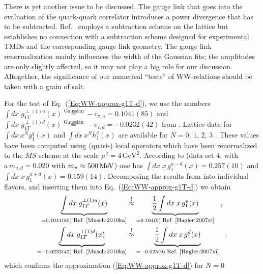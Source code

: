 \documentclass[a4paper,11pt]{article}
\newcommand{\ba}{\begin{eqnarray}}
\newcommand{\ea}{\end{eqnarray}}
\begin{document}
There is yet another issue to be discussed. 
The gauge link that goes into the evaluation of the quark-quark correlator 
introduces a power divergence that has to be subtracted. 
Ref.~\cite{Musch:2010ka} employs a subtraction scheme on the lattice
but establishes no connection with a subtraction scheme designed for 
experimental TMDs and the corresponding gauge link geometry. 
The gauge link renormalization mainly 
influences the width of the Gaussian fits; the amplitudes are only slightly 
affected, so it may not play a big role for our discussion. Altogether, the 
significance of our numerical ``tests'' of WW-relations should be taken 
with a grain of salt.

For the test of Eq.~(\ref{Eq:WW-approx-g1T-d}), we use the numbers 
$\int d x\;g_{1T}^{\perp(1)u}(x)\stackrel{\text{Gaussian}}{=}-c_{7,u}= 0.1041(85)$ 
and
$\int d x\;g_{1T}^{\perp(1)d}(x)\stackrel{\text{Gaussian}}{=}-c_{7,d}=-0.0232(42)$
from \cite{Musch:2010ka}. %
Lattice data for
$\int d x \,x^{N}g_1^q(x)$
\cite{Hagler:2003is,Hagler:2007xi} and
$\int d x \,x^{N}h_1^q(x)$
\cite{Gockeler:2005cj} are available for $N=0,\,1,\,2,\,3$ .
These values have been computed using (quasi-) local operators which 
have been renormalized to the $\overline{MS}$ scheme at the scale 
$\mu^2 = 4\,\text{GeV}^2$.
According to \cite{Hagler:2007xi} (data set 4:
with $a\,m_{u,d} = 0.020$ with $m_\pi\approx 500\,{\rm MeV}$)
one has $\int d x \;x\,g_1^{u-d}(x)= 0.257(10)$ and
$\int d x \;x\,g_1^{u+d}(x)= 0.159(14)$.
Decomposing the results from  \cite{Hagler:2007xi} into
individual flavors, and inserting them into
Eq.~(\ref{Eq:WW-approx-g1T-d}) we obtain
\ba
        \underbrace{\int d x\;g_{1T}^{\perp(1)u}(x)}
        _{= 0.1041(85) \;\mbox{\footnotesize Ref.~\cite{Musch:2010ka}}}
        &\stackrel{!}{\approx}
        \underbrace{\frac{1}{2}\int d x\;x\,g_1^u(x)}
        _{= 0.104(9) \;\mbox{\footnotesize Ref.~\cite{Hagler:2007xi}}}
        \hspace{3mm} , \nonumber \\
        \underbrace{\int d x\;g_{1T}^{\perp(1)d}(x)}
        _{= -0.0232(42) \;\mbox{\footnotesize Ref.~\cite{Musch:2010ka}}}
        &\stackrel{!}{\approx}
        \underbrace{\frac{1}{2}\int d x\;x\,g_1^d(x)}
        _{= -0.025(9) \;\mbox{\footnotesize Ref.~\cite{Hagler:2007xi}}}
        \hspace{3mm}, 
        \label{Eq:test-WW-type-lattice-g1T}
\ea
which confirms the approximation (\ref{Eq:WW-approx-g1T-d}) for $N=0$
\end{document}
